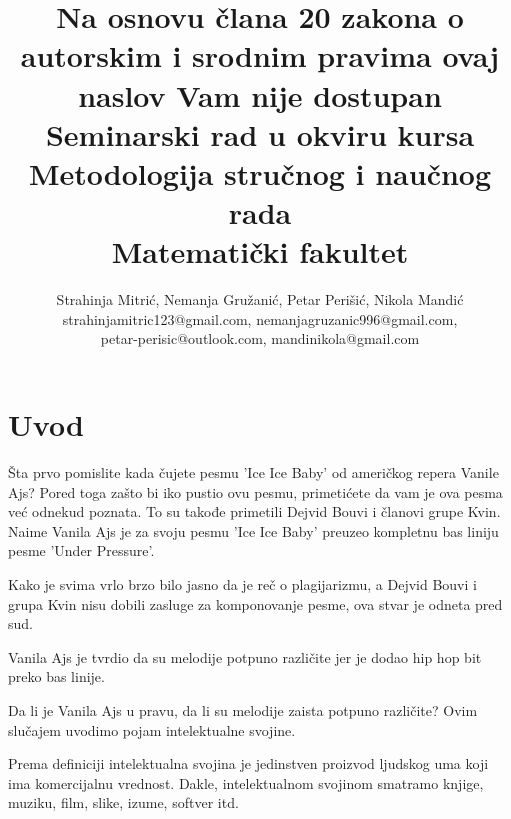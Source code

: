 \documentclass[a4paper]{article}
\begin{document}
\title{Na osnovu člana 20 zakona o autorskim i srodnim pravima ovaj naslov Vam nije dostupan\\
\large Seminarski rad u okviru kursa\\Metodologija stručnog i naučnog rada\\ Matematički fakultet}

\author{Strahinja Mitrić, Nemanja Gružanić, Petar Perišić, Nikola Mandić\\ strahinjamitric123@gmail.com, nemanjagruzanic996@gmail.com,\\ petar-perisic@outlook.com, mandinikola@gmail.com
}

\maketitle



\tableofcontents

\newpage

\section{Uvod}
\label{sec:uvod}

Šta prvo pomislite kada čujete pesmu 'Ice Ice Baby' od američkog repera Vanile Ajs?
Pored toga zašto bi iko pustio ovu pesmu, primetićete da vam je ova pesma već odnekud poznata.
To su takođe primetili Dejvid Bouvi i članovi grupe Kvin.
Naime Vanila Ajs je za svoju pesmu 'Ice Ice Baby' preuzeo kompletnu bas liniju pesme 'Under Pressure'.

Kako je svima vrlo brzo bilo jasno da je reč o plagijarizmu, a Dejvid Bouvi i grupa Kvin nisu dobili
zasluge za komponovanje pesme, ova stvar je odneta pred sud.

Vanila Ajs je tvrdio da su melodije potpuno različite jer je dodao hip hop bit preko bas linije. \cite{rollingstone}

Da li je Vanila Ajs u pravu, da li su melodije zaista potpuno različite? Ovim slučajem uvodimo pojam intelektualne svojine.

Prema definiciji intelektualna svojina je jedinstven proizvod ljudskog uma koji ima komercijalnu vrednost. \cite{texasUniv}
Dakle, intelektualnom svojinom smatramo knjige, muziku, film, slike, izume, softver itd.
\end{document}

